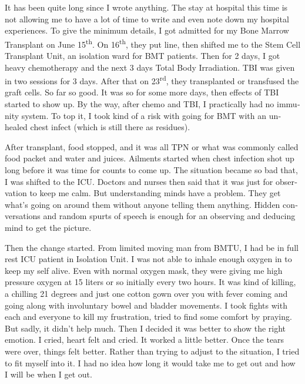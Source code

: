 \begin{english}
\vskip 2pt

It has been quite long since I wrote anything. The stay at hospital this time is not allowing me to have a lot of time to write and even note down my hospital experiences. To give the minimum details, I got admitted for my Bone Marrow Transplant on June 15\textsuperscript{th}. On 16\textsuperscript{th}, they put line, then shifted me to the Stem Cell Transplant Unit, an isolation ward for BMT patients. Then for 2 days, I got heavy chemotherapy and the next 3 days Total Body Irradiation. TBI was given in two sessions for 3 days. After that on 23\textsuperscript{rd}, they transplanted or transfused the graft cells. So far so good. It was so for some more days, then effects of TBI started to show up. By the way, after chemo and TBI, I practically had no immunity system. To top it, I took kind of a risk with going for BMT with an unhealed chest infect (which is still there as residues). 

After transplant, food stopped, and it was all TPN or what was commonly called food packet and water and juices. Ailments started when chest infection shot up long before it was time for counts to come up. The situation became so bad that, I was shifted to the ICU. Doctors and nurses then said that it was just for observation to keep me calm. But understanding minds have a problem. They get what's going on around them without anyone telling them anything. Hidden conversations and random spurts of speech is enough for an observing and deducing mind to get the picture. 

Then the change started. From limited moving man from BMTU, I had be in full rest ICU patient in Isolation Unit. I was not able to inhale enough oxygen in to keep my self alive. Even with normal oxygen mask, they were giving me high pressure oxygen at 15 liters or so initially every two hours. It was kind of killing, a chilling 21 degrees and just one cotton gown over you with fever coming and going along with involuntary bowel and bladder movements. I took fights with each and everyone to kill my frustration, tried to find some comfort by praying. But sadly, it didn't help much. Then I decided it was better to show the right emotion. I cried, heart felt and cried. It worked a little better. Once the tears were over, things felt better. Rather than trying to adjust to the situation, I tried to fit myself into it. I had no idea how long it would take me to get out and how I will be when I get out. 


\end{english}
